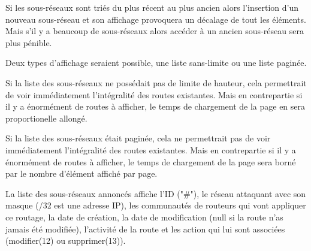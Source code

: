 Si les sous-réseaux sont triés du plus récent au plus ancien alors l'insertion d'un nouveau sous-réseau et son affichage provoquera un décalage de tout les éléments. Mais s'il y a beaucoup de sous-réseaux alors accéder à un ancien sous-réseau sera plus pénible.

Deux types d'affichage seraient possible, une liste sans-limite ou une liste paginée.

Si la liste des sous-réseaux ne possédait pas de limite de hauteur, cela permettrait de voir immédiatement l'intégralité des routes existantes. Mais en contrepartie si il y a énormément de routes à afficher, le temps de chargement de la page en sera proportionelle allongé.

Si la liste des sous-réseaux était paginée, cela ne permettrait pas de voir immédiatement l'intégralité des routes existantes. Mais en contrepartie si il y a énormément de routes à afficher, le temps de chargement de la page sera borné par le nombre d'élément affiché par page.

La liste des sous-réseaux annoncés affiche l'ID ("\#"), le réseau attaquant avec son masque (/32 est une adresse IP), les communautés de routeurs qui vont appliquer ce routage, la date de création, la date de modification (null si la route n'as jamais été modifiée), l'activité de la route et les action qui lui sont associées (modifier(12) ou supprimer(13)).


